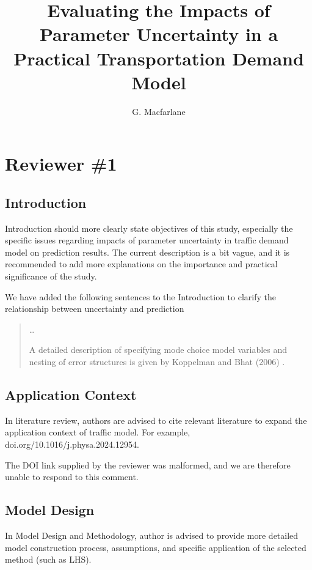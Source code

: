 \documentclass{ar2rc}
\title{Evaluating the Impacts of Parameter Uncertainty in a Practical Transportation Demand Model}
\author{G. Macfarlane}
\begin{document}
\maketitle

\section{Reviewer \#1}

\subsection{Introduction}
\RC Introduction should more clearly state objectives of this study, especially
the specific issues regarding impacts of parameter uncertainty in traffic demand
model on prediction results. The current description is a bit vague, and it is
recommended to add more explanations on the importance and practical
significance of the study.

\AR We have added the following sentences to the Introduction to clarify the relationship
between uncertainty and prediction

\begin{quote}
    \DIFaddbegin {}\DIFaddend 

    \ldots

    A detailed description of specifying mode choice model variables and nesting
    of error structures is given by Koppelman and Bhat (2006)\DIFaddbegin
    \DIFaddend .
\end{quote}

\subsection{Application Context}
\RC In literature review, authors are advised to cite relevant literature to
expand the application context of traffic model. For example,
doi.org/10.1016/j.physa.2024.12954.

\AR The DOI link supplied by the reviewer was malformed, and we are therefore
unable to respond to this comment.

\subsection{Model Design}
\RC In Model Design and Methodology, author is advised to provide more detailed
model construction process, assumptions, and specific application of the
selected method (such as LHS).
\end{document}
